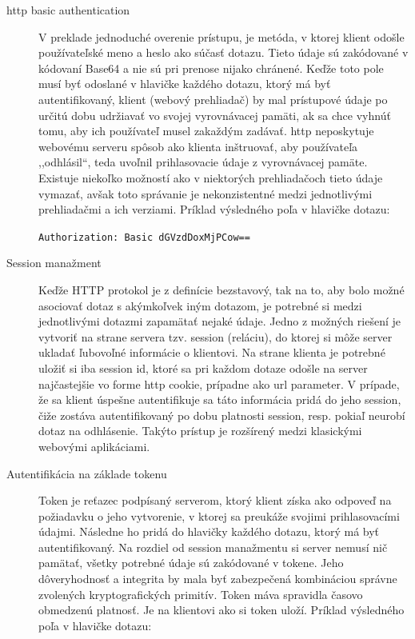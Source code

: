 \begin{description}
\item[\acrshort{http} basic authentication] V preklade jednoduché overenie
  prístupu, je metóda, v ktorej klient odošle používateľské meno a heslo ako
  súčasť dotazu. Tieto údaje sú zakódované v kódovaní Base64 a nie sú pri
  prenose nijako chránené. \cite{rfc7617} Keďže toto pole musí byť odoslané v
  hlavičke každého dotazu, ktorý má byť autentifikovaný, klient (webový
  prehliadač) by mal prístupové údaje po určitú dobu udržiavať vo svojej
  vyrovnávacej pamäti, ak sa chce vyhnúť tomu, aby ich používateľ musel zakaždým
  zadávať. \acrshort{http} neposkytuje webovému serveru spôsob ako klienta
  inštruovať, aby používateľa ,,odhlásil``, teda uvoľnil prihlasovacie údaje z
  vyrovnávacej pamäte. Existuje niekoľko možností ako v niektorých prehliadačoch
  tieto údaje vymazať, avšak toto správanie je nekonzistentné medzi jednotlivými
  prehliadačmi a ich verziami. Príklad výsledného poľa v hlavičke dotazu:

  \texttt{Authorization: Basic dGVzdDoxMjPCow==}

\item[Session manažment] Keďže HTTP protokol je z definície bezstavový, tak na
  to, aby bolo možné asociovať dotaz s akýmkoľvek iným dotazom, je potrebné si
  medzi jednotlivými dotazmi zapamätať nejaké údaje. Jedno z možných riešení je
  vytvoriť na strane servera tzv. session (reláciu), do ktorej si môže server
  ukladať ľubovoľné informácie o klientovi. Na strane klienta je potrebné uložiť
  si iba session \acrshort{id}, ktoré sa pri každom dotaze odošle na server
  najčastejšie vo forme \acrshort{http} cookie, prípadne ako \acrshort{url}
  parameter. V prípade, že sa klient úspešne autentifikuje sa táto informácia
  pridá do jeho session, čiže zostáva autentifikovaný po dobu platnosti session,
  resp. pokiaľ neurobí dotaz na odhlásenie. Takýto prístup je rozšírený medzi
  klasickými webovými aplikáciami.

\item[Autentifikácia na základe tokenu] Token je reťazec podpísaný serverom,
  ktorý klient získa ako odpoveď na požiadavku o jeho vytvorenie, v ktorej sa
  preukáže svojimi prihlasovacími údajmi. Následne ho pridá do hlavičky každého
  dotazu, ktorý má byť autentifikovaný. Na rozdiel od session manažmentu si
  server nemusí nič pamätať, všetky potrebné údaje sú zakódované v tokene. Jeho
  dôveryhodnosť a integrita by mala byť zabezpečená kombináciou správne
  zvolených kryptografických primitív. Token máva spravidla časovo obmedzenú
  platnosť. Je na klientovi ako si token uloží. Príklad výsledného poľa v
  hlavičke dotazu:


\end{description}
